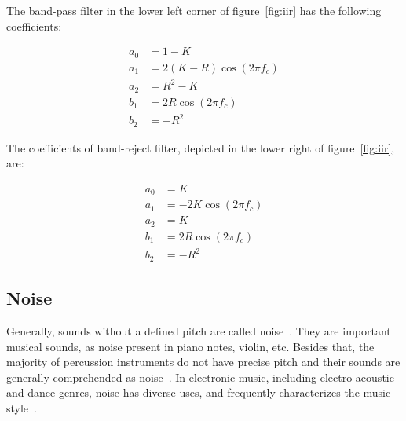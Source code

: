 \documentclass[
 aip,
 jmp,
 amsmath,amssymb,
 reprint,
]{revtex4-1}
\begin{document}
\begin{enumerate}
The band-pass filter in the lower left corner of figure~\ref{fig:iir} has the following coefficients:

\begin{equation}\label{eq:passa-banda}
 \begin{split}
 a_0 & =  1 - K \\
 a_1 & =  2(K-R)\cos (2\pi f_c) \\
 a_2 & =  R^2-K \\
 b_1 & =  2R \cos (2\pi f_c) \\
 b_2 & =  -R^2
 \end{split}
\end{equation}

The coefficients of band-reject filter, depicted in the lower right of figure~\ref{fig:iir}, are:

\begin{equation}\label{eq:rejeita-banda}
 \begin{split}
 a_0 & =  K \\
 a_1 & =  -2K\cos (2\pi f_c) \\
 a_2 & =  K \\
 b_1 & =  2R \cos (2\pi f_c) \\
 b_2 & =  -R^2
\end{split}
\end{equation}


\end{enumerate}

\subsection{Noise}\label{subsec:ruidos}

Generally, sounds without a defined pitch are called noise~\cite{Lacerda}.
They are important musical sounds, as noise present in piano notes, violin, etc. Besides that, the majority of percussion instruments do not have precise pitch and their sounds are generally comprehended as noise~\cite{Roederer}. In electronic music, including electro-acoustic and dance genres, noise has diverse uses, and frequently characterizes the music style~\cite{Cook}. 
\end{document}
